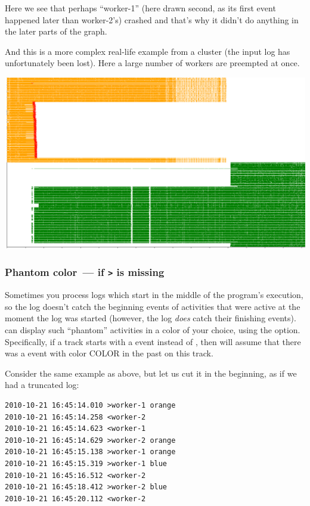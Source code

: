 \documentclass{article}
\begin{document}
Here we see that perhaps ``worker-1'' (here drawn second, as its first event happened later than worker-2's) crashed and that's why it didn't do anything in the later parts of the graph.

And this is a more complex real-life example from a cluster (the input log has unfortunately been lost). Here a large number of workers are preempted at once.

\centerline{\includegraphics[width=\textwidth]{pics/splot/splot-expire-large-example.png}}

\subsubsection{Phantom color~--- if \texttt{>} is missing}

Sometimes you process logs which start in the middle of the program's execution, so the log doesn't catch the beginning events of activities that were active at the moment the log was started (however, the log \emph{does} catch their finishing events). \splot{} can display such ``phantom'' activities in a color of your choice, using the  option. Specifically, if a track starts with a \hlverb{<} event instead of \hlverb{>}, then \splot{} will assume that there was a \hlverb{>} event with color COLOR in the past on this track.

Consider the same example as above, but let us cut it in the beginning, as if we had a truncated log:

\begin{verbatim}
2010-10-21 16:45:14.010 >worker-1 orange
2010-10-21 16:45:14.258 <worker-2
2010-10-21 16:45:14.623 <worker-1
2010-10-21 16:45:14.629 >worker-2 orange
2010-10-21 16:45:15.138 >worker-1 orange
2010-10-21 16:45:15.319 >worker-1 blue
2010-10-21 16:45:16.512 <worker-2
2010-10-21 16:45:18.412 >worker-2 blue
2010-10-21 16:45:20.112 <worker-2
\end{verbatim}
\end{document}

